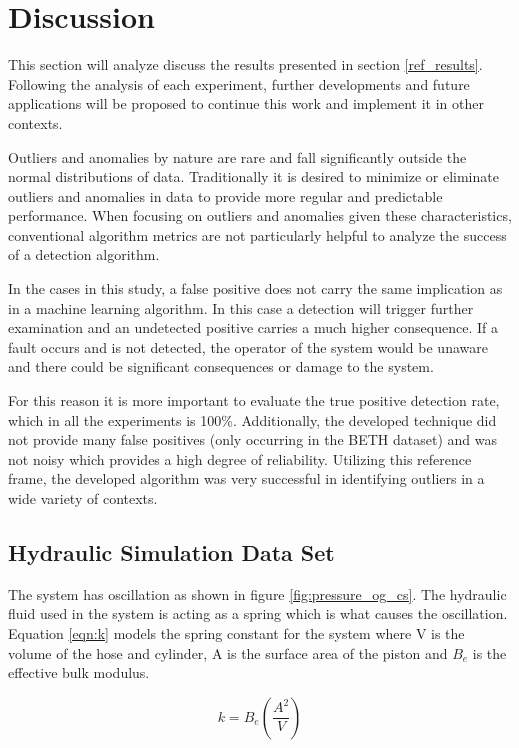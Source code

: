 \section{Discussion}
\label{sec:discussion}
This section will analyze discuss the results presented in section \ref{ref_results}. Following the analysis of each experiment, further developments and future applications will be proposed to continue this work and implement it in other contexts.

Outliers and anomalies by nature are rare and fall significantly outside the normal distributions of data. Traditionally it is desired to minimize or eliminate outliers and anomalies in data to provide more regular and predictable performance. When focusing on outliers and anomalies given these characteristics, conventional algorithm metrics are not particularly helpful to analyze the success of a detection algorithm.

In the cases in this study, a false positive does not carry the same implication as in a machine learning algorithm. In this case a detection will trigger further examination and an undetected positive carries a much higher consequence. If a fault occurs and is not detected, the operator of the system would be unaware and there could be significant consequences or damage to the system.

For this reason it is more important to evaluate the true positive detection rate, which in all the experiments is 100\%. Additionally, the developed technique did not provide many false positives (only occurring in the BETH dataset) and was not noisy which provides a high degree of reliability. Utilizing this reference frame, the developed algorithm was very successful in identifying outliers in a wide variety of contexts.

\subsection{Hydraulic Simulation Data Set}
The system has oscillation as shown in figure \ref{fig:pressure_og_cs}. The hydraulic fluid used in the system is acting as a spring which is what causes the oscillation. Equation \ref{eqn:k} models the spring constant for the system where V is the volume of the hose and cylinder, A is the surface area of the piston and $B_e$ is the effective bulk modulus. 

\begin{equation}
    k = B_e \left ( \frac{A^2}{V} \right)
    \label{eqn:k}
\end{equation}

